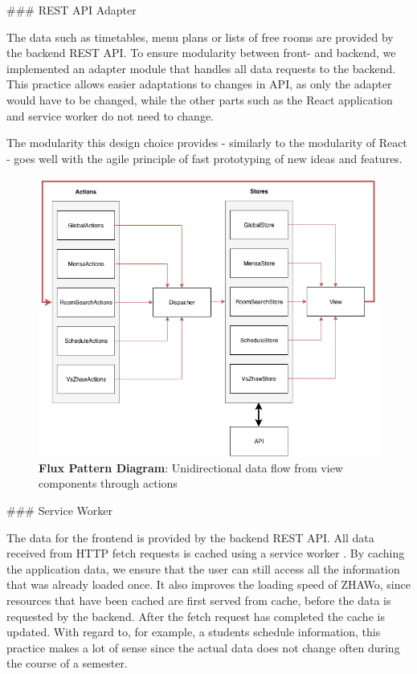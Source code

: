 \begin{markdown}
### REST API Adapter

The data such as timetables, menu plans or lists of free rooms are provided by the backend REST API. To ensure modularity between front- and backend, we implemented an adapter module that handles all data requests to the backend. This practice allows easier adaptations to changes in API, as only the adapter would have to be changed, while the other parts such as the React application and service worker do not need to change.

The modularity this design choice provides - similarly to the modularity of React - goes well with the agile principle of fast prototyping of new ideas and features.

\bigskip

\begin{figure}[H]
  \includegraphics[width=14cm, center]{../../diagrams/flux.png}
  \captionsetup{width=13.5cm}
  \caption[Flux Pattern Diagram]{\textbf{Flux Pattern Diagram}: Unidirectional data flow from view components through actions }
\end{figure}

\bigskip

### Service Worker

The data for the frontend is provided by the backend REST API. All data received from HTTP fetch requests is cached using a service worker \cite{ServiceWorker}. By caching the application data, we ensure that the user can still access all the information that was already loaded once. It also improves the loading speed of ZHAWo, since resources that have been cached are first served from cache, before the data is requested by the backend. After the fetch request has completed the cache is updated. With regard to, for example, a students schedule information, this practice makes a lot of sense since the actual data does not change often during the course of a semester.


\end{markdown}
